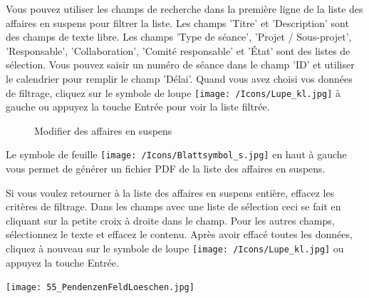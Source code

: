 \begin{figure}[H]
\end{figure}

Vous pouvez utiliser les champs de recherche dans la première ligne de la liste des affaires en suspens pour filtrer la liste. Les champs 'Titre' et 'Description' sont des champs de texte libre. Les champs 'Type de séance', 'Projet / Sous-projet', 'Responsable', 'Collaboration', 'Comité responsable' et 'État' sont des listes de sélection. Vous pouvez saisir un numéro de séance dans le champ 'ID' et utiliser le calendrier pour remplir le champ 'Délai'. Quand vous avez choisi vos données de filtrage, cliquez sur le symbole de loupe \texttt{[image: /Icons/Lupe\_kl.jpg]}  à gauche ou appuyez la touche Entrée pour voir la liste filtrée.

\begin{figure}[H]
\caption{Modifier des affaires en suspens}
\end{figure}

Le symbole de feuille \texttt{[image: /Icons/Blattsymbol\_s.jpg]}  en haut à gauche vous permet de générer un fichier PDF de la liste des affaires en suspens.

\vspace{\baselineskip}

Si vous voulez retourner à la liste des affaires en suspens entière, effacez les critères de filtrage. Dans les champs avec une liste de sélection ceci se fait en cliquant sur la petite croix  à droite dans le champ. Pour les autres champs, sélectionnez le texte et effacez le contenu. Après avoir effacé toutes les données, cliquez à nouveau sur le symbole de loupe \texttt{[image: /Icons/Lupe\_kl.jpg]}  ou appuyez la touche Entrée.

\begin{center}
\texttt{[image: 55\_PendenzenFeldLoeschen.jpg]}
\end{center}

